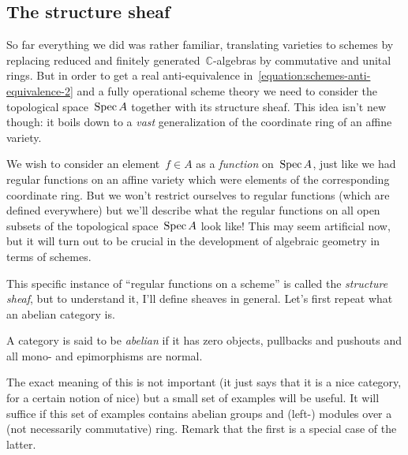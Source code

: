 \subsection{The structure sheaf}
So far everything we did was rather familiar, translating varieties to schemes by replacing reduced and finitely generated~$\mathbb{C}$-algebras by commutative and unital rings. But in order to get a real anti-equivalence in~\eqref{equation:schemes-anti-equivalence-2} and a fully operational scheme theory we need to consider the topological space~$\operatorname{Spec} A$ together with its structure sheaf. This idea isn't new though: it boils down to a \emph{vast} generalization of the coordinate ring of an affine variety.

We wish to consider an element~$f\in A$ as a \emph{function} on~$\operatorname{Spec} A$, just like we had regular functions on an affine variety which were elements of the corresponding coordinate ring. But we won't restrict ourselves to regular functions (which are defined everywhere) but we'll describe what the regular functions on all open subsets of the topological space~$\operatorname{Spec} A$ look like! This may seem artificial now, but it will turn out to be crucial in the development of algebraic geometry in terms of schemes.

This specific instance of ``regular functions on a scheme'' is called the \emph{structure sheaf}, but to understand it, I'll define sheaves in general. Let's first repeat what an abelian category is.

\begin{definition}
  A category is said to be \emph{abelian} if it has zero objects, pullbacks and pushouts and all mono- and epimorphisms are normal.
\end{definition}

The exact meaning of this is not important (it just says that it is a nice category, for a certain notion of nice) but a small set of examples will be useful. It will suffice if this set of examples contains abelian groups and (left-) modules over a (not necessarily commutative) ring. Remark that the first is a special case of the latter.

